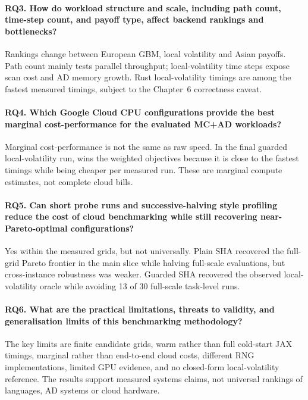 \paragraph{RQ3. How do workload structure and scale, including path count, time-step count, and payoff type, affect backend rankings and bottlenecks?}
Rankings change between European GBM, local volatility and Asian payoffs. Path
count mainly tests parallel throughput; local-volatility time steps expose scan
cost and AD memory growth. Rust local-volatility timings are among the fastest
measured timings, subject to the Chapter~6 correctness caveat.

\paragraph{RQ4. Which Google Cloud CPU configurations provide the best marginal cost-performance for the evaluated MC+AD workloads?}
Marginal cost-performance is not the same as raw speed. In the final guarded
local-volatility run,  wins the weighted objectives because
it is close to the fastest  timings while being cheaper per
measured run. These are marginal compute estimates, not complete cloud bills.

\paragraph{RQ5. Can short probe runs and successive-halving style profiling reduce the cost of cloud benchmarking while still recovering near-Pareto-optimal configurations?}
Yes within the measured grids, but not universally. Plain SHA recovered the
full-grid Pareto frontier in the main  slice while halving
full-scale evaluations, but cross-instance robustness was weaker. Guarded SHA
recovered the observed local-volatility oracle while avoiding 13 of 30
full-scale task-level runs.

\paragraph{RQ6. What are the practical limitations, threats to validity, and generalisation limits of this benchmarking methodology?}
The key limits are finite candidate grids, warm rather than full cold-start JAX
timings, marginal rather than end-to-end cloud costs, different RNG
implementations, limited GPU evidence, and no closed-form local-volatility
reference. The results support measured systems claims, not universal rankings
of languages, AD systems or cloud hardware.


